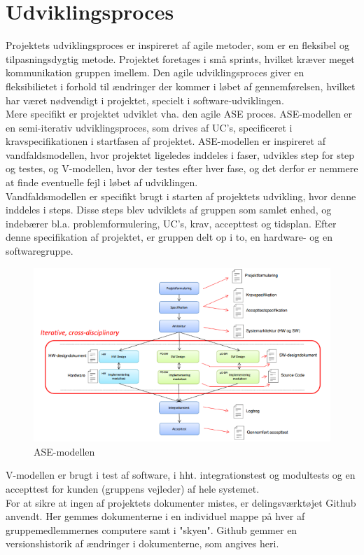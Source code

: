 \section{Udviklingsproces}
Projektets udviklingsproces er inspireret af agile metoder, som er en fleksibel og tilpasningsdygtig metode. Projektet foretages i små sprints, hvilket kræver meget kommunikation gruppen imellem. Den agile udviklingsproces giver en fleksibilietet i forhold til ændringer der kommer i løbet af gennemførelsen, hvilket har været nødvendigt i projektet, specielt i software-udviklingen.\\
\newline
Mere specifikt er projektet udviklet vha. den agile ASE proces. ASE-modellen er en semi-iterativ udviklingsproces, som drives af UC's, specificeret i kravspecifikationen i startfasen af projektet. ASE-modellen er inspireret af vandfaldsmodellen, hvor projektet ligeledes inddeles i faser, udvikles step for step og testes, og V-modellen, hvor der testes efter hver fase, og det derfor er nemmere at finde eventuelle fejl i løbet af udviklingen.\\
\newline
Vandfaldsmodellen er specifikt brugt i starten af projektets udvikling, hvor denne inddeles i steps. Disse steps blev udviklets af gruppen som samlet enhed, og indebærer bl.a. problemformulering, UC's, krav, accepttest og tidsplan. Efter denne specifikation af projektet, er gruppen delt op i to, en hardware- og en softwaregruppe.

\begin{figure}[H]
\centering
\includegraphics[scale=0.80]{ase.PNG}
\caption{ASE-modellen}
\end{figure}

V-modellen er brugt i test af software, i hht. integrationstest og modultests og en accepttest for kunden (gruppens vejleder) af hele systemet. \\
\newline
For at sikre at ingen af projektets dokumenter mistes, er delingsværktøjet Github anvendt. Her gemmes dokumenterne i en individuel mappe på hver af gruppemedlemmernes computere samt i "skyen". Github gemmer en versionshistorik af ændringer i dokumenterne, som angives heri.  

